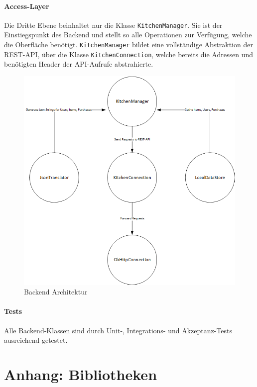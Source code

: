 \documentclass{scrartcl}
\begin{document}
			\paragraph*{Access-Layer}
			Die Dritte Ebene beinhaltet nur die Klasse \texttt{KitchenManager}. Sie ist der Einstiegspunkt des Backend und stellt so alle Operationen zur Verfügung, welche die Oberfläche benötigt. \texttt{KitchenManager} bildet eine vollständige Abstraktion der REST-API, über die Klasse \texttt{KitchenConnection}, welche bereits die Adressen und benötigten Header der API-Aufrufe abstrahierte.
		
			\begin{figure}[!h]
				\centering
				\includegraphics[scale=0.5]{./figures/classStructure.png}
				\caption{Backend Architektur}
				\label{backendArchitecture}	
			\end{figure}

			\paragraph*{Tests}
			Alle Backend-Klassen sind durch Unit-, Integrations- und Akzeptanz-Tests ausreichend getestet.
	
	\section{Anhang: Bibliotheken} \label{bib}
		
\end{document}
